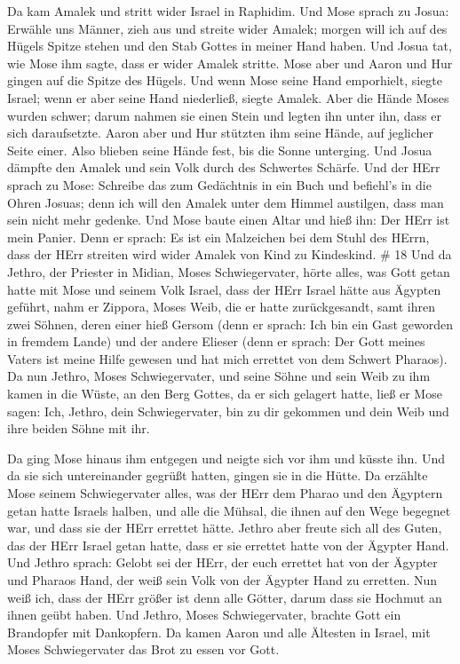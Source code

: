  Da kam Amalek und stritt wider Israel in Raphidim.
 Und Mose sprach zu Josua: Erwähle uns Männer, zieh aus und
streite wider Amalek; morgen will ich auf des Hügels Spitze stehen und
den Stab Gottes in meiner Hand haben.  Und Josua tat, wie
Mose ihm sagte, dass er wider Amalek stritte. Mose aber und Aaron und
Hur gingen auf die Spitze des Hügels.  Und wenn Mose seine
Hand emporhielt, siegte Israel; wenn er aber seine Hand niederließ,
siegte Amalek.  Aber die Hände Moses wurden schwer; darum
nahmen sie einen Stein und legten ihn unter ihn, dass er sich
daraufsetzte. Aaron aber und Hur stützten ihm seine Hände, auf jeglicher
Seite einer. Also blieben seine Hände fest, bis die Sonne unterging.
 Und Josua dämpfte den Amalek und sein Volk durch des
Schwertes Schärfe.  Und der HErr sprach zu Mose: Schreibe
das zum Gedächtnis in ein Buch und befiehl's in die Ohren Josuas; denn
ich will den Amalek unter dem Himmel austilgen, dass man sein nicht mehr
gedenke.  Und Mose baute einen Altar und hieß ihn: Der HErr
ist mein Panier.  Denn er sprach: Es ist ein Malzeichen bei
dem Stuhl des HErrn, dass der HErr streiten wird wider Amalek von Kind
zu Kindeskind. \# 18  Und da Jethro, der Priester in Midian,
Moses Schwiegervater, hörte alles, was Gott getan hatte mit Mose und
seinem Volk Israel, dass der HErr Israel hätte aus Ägypten geführt,
 nahm er Zippora, Moses Weib, die er hatte zurückgesandt,
 samt ihren zwei Söhnen, deren einer hieß Gersom (denn er
sprach: Ich bin ein Gast geworden in fremdem Lande)  und der
andere Elieser (denn er sprach: Der Gott meines Vaters ist meine Hilfe
gewesen und hat mich errettet von dem Schwert Pharaos).  Da
nun Jethro, Moses Schwiegervater, und seine Söhne und sein Weib zu ihm
kamen in die Wüste, an den Berg Gottes, da er sich gelagert hatte,
 ließ er Mose sagen: Ich, Jethro, dein Schwiegervater, bin
zu dir gekommen und dein Weib und ihre beiden Söhne mit ihr.

 Da ging Mose hinaus ihm entgegen und neigte sich vor ihm
und küsste ihn. Und da sie sich untereinander gegrüßt hatten, gingen sie
in die Hütte.  Da erzählte Mose seinem Schwiegervater alles,
was der HErr dem Pharao und den Ägyptern getan hatte Israels halben, und
alle die Mühsal, die ihnen auf den Wege begegnet war, und dass sie der
HErr errettet hätte.  Jethro aber freute sich all des Guten,
das der HErr Israel getan hatte, dass er sie errettet hatte von der
Ägypter Hand.  Und Jethro sprach: Gelobt sei der HErr, der
euch errettet hat von der Ägypter und Pharaos Hand, der weiß sein Volk
von der Ägypter Hand zu erretten.  Nun weiß ich, dass der
HErr größer ist denn alle Götter, darum dass sie Hochmut an ihnen geübt
haben.  Und Jethro, Moses Schwiegervater, brachte Gott ein
Brandopfer mit Dankopfern. Da kamen Aaron und alle Ältesten in Israel,
mit Moses Schwiegervater das Brot zu essen vor Gott.

